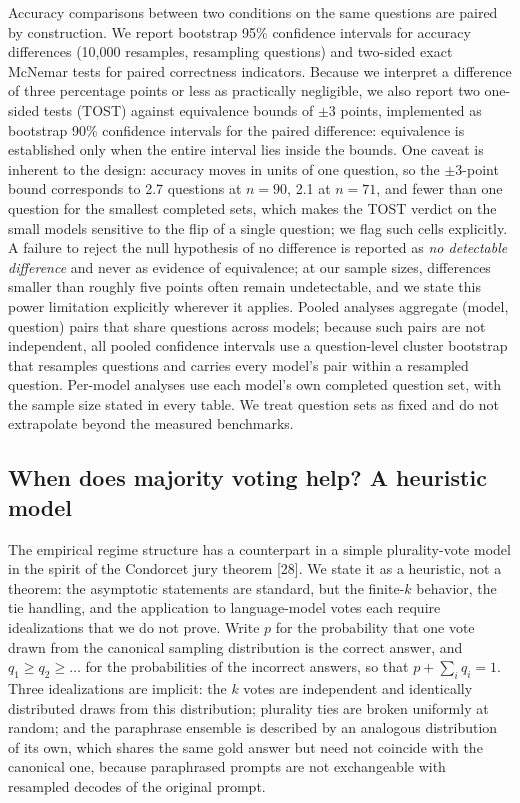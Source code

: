 \documentclass[preprint,12pt]{elsarticle}
\begin{document}
Accuracy comparisons between two conditions on the same questions are paired by construction. We report bootstrap 95\% confidence intervals for accuracy differences (10,000 resamples, resampling questions) and two-sided exact McNemar tests for paired correctness indicators. Because we interpret a difference of three percentage points or less as practically negligible, we also report two one-sided tests (TOST) against equivalence bounds of $\pm 3$ points, implemented as bootstrap 90\% confidence intervals for the paired difference: equivalence is established only when the entire interval lies inside the bounds. One caveat is inherent to the design: accuracy moves in units of one question, so the $\pm 3$-point bound corresponds to 2.7 questions at $n = 90$, 2.1 at $n = 71$, and fewer than one question for the smallest completed sets, which makes the TOST verdict on the small models sensitive to the flip of a single question; we flag such cells explicitly. A failure to reject the null hypothesis of no difference is reported as \emph{no detectable difference} and never as evidence of equivalence; at our sample sizes, differences smaller than roughly five points often remain undetectable, and we state this power limitation explicitly wherever it applies. Pooled analyses aggregate (model, question) pairs that share questions across models; because such pairs are not independent, all pooled confidence intervals use a question-level cluster bootstrap that resamples questions and carries every model's pair within a resampled question. Per-model analyses use each model's own completed question set, with the sample size stated in every table. We treat question sets as fixed and do not extrapolate beyond the measured benchmarks.

\subsection{When does majority voting help? A heuristic model}


The empirical regime structure has a counterpart in a simple plurality-vote model in the spirit of the Condorcet jury theorem [28]. We state it as a heuristic, not a theorem: the asymptotic statements are standard, but the finite-$k$ behavior, the tie handling, and the application to language-model votes each require idealizations that we do not prove. Write $p$ for the probability that one vote drawn from the canonical sampling distribution is the correct answer, and $q_1 \ge q_2 \ge \dots$ for the probabilities of the incorrect answers, so that $p + \sum_i q_i = 1$. Three idealizations are implicit: the $k$ votes are independent and identically distributed draws from this distribution; plurality ties are broken uniformly at random; and the paraphrase ensemble is described by an analogous distribution of its own, which shares the same gold answer but need not coincide with the canonical one, because paraphrased prompts are not exchangeable with resampled decodes of the original prompt.
\end{document}
